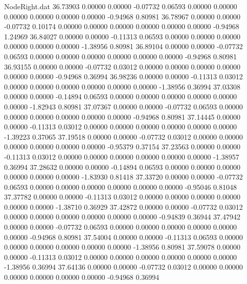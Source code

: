 \begin{filecontents}{NodeRight.dat}
  36.73903    0.00000    0.00000    -0.07732    0.06593    0.00000    0.00000    0.00000    0.00000    0.00000    0.00000   -0.94968    0.80981
  36.78967    0.00000    0.00000    -0.07732    0.10174    0.00000    0.00000    0.00000    0.00000    0.00000    0.00000   -0.94968    1.24969
  36.84027    0.00000    0.00000    -0.11313    0.06593    0.00000    0.00000    0.00000    0.00000    0.00000    0.00000   -1.38956    0.80981
  36.89104    0.00000    0.00000    -0.07732    0.06593    0.00000    0.00000    0.00000    0.00000    0.00000    0.00000   -0.94968    0.80981
  36.93155    0.00000    0.00000    -0.07732    0.03012    0.00000    0.00000    0.00000    0.00000    0.00000    0.00000   -0.94968    0.36994
  36.98236    0.00000    0.00000    -0.11313    0.03012    0.00000    0.00000    0.00000    0.00000    0.00000    0.00000   -1.38956    0.36994
  37.03308    0.00000    0.00000    -0.14894    0.06593    0.00000    0.00000    0.00000    0.00000    0.00000    0.00000   -1.82943    0.80981
  37.07367    0.00000    0.00000    -0.07732    0.06593    0.00000    0.00000    0.00000    0.00000    0.00000    0.00000   -0.94968    0.80981
  37.14445    0.00000    0.00000    -0.11313    0.03012    0.00000    0.00000    0.00000    0.00000    0.00000    0.00000   -1.39223    0.37065
  37.19518    0.00000    0.00000    -0.07732    0.03012    0.00000    0.00000    0.00000    0.00000    0.00000    0.00000   -0.95379    0.37154
  37.23563    0.00000    0.00000    -0.11313    0.03012    0.00000    0.00000    0.00000    0.00000    0.00000    0.00000   -1.38957    0.36994
  37.28632    0.00000    0.00000    -0.14894    0.06593    0.00000    0.00000    0.00000    0.00000    0.00000    0.00000   -1.83930    0.81418
  37.33720    0.00000    0.00000    -0.07732    0.06593    0.00000    0.00000    0.00000    0.00000    0.00000    0.00000   -0.95046    0.81048
  37.37782    0.00000    0.00000    -0.11313    0.03012    0.00000    0.00000    0.00000    0.00000    0.00000    0.00000   -1.38710    0.36929
  37.42872    0.00000    0.00000    -0.07732    0.03012    0.00000    0.00000    0.00000    0.00000    0.00000    0.00000   -0.94839    0.36944
  37.47942    0.00000    0.00000    -0.07732    0.06593    0.00000    0.00000    0.00000    0.00000    0.00000    0.00000   -0.94968    0.80981
  37.54004    0.00000    0.00000    -0.11313    0.06593    0.00000    0.00000    0.00000    0.00000    0.00000    0.00000   -1.38956    0.80981
  37.59078    0.00000    0.00000    -0.11313    0.03012    0.00000    0.00000    0.00000    0.00000    0.00000    0.00000   -1.38956    0.36994
  37.64136    0.00000    0.00000    -0.07732    0.03012    0.00000    0.00000    0.00000    0.00000    0.00000    0.00000   -0.94968    0.36994

\end{filecontents}
